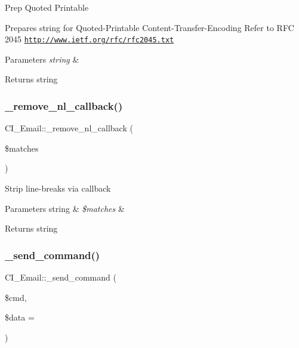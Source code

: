 Prep Quoted Printable

Prepares string for Quoted-\/\+Printable Content-\/\+Transfer-\/\+Encoding Refer to R\+FC 2045 \href{http://www.ietf.org/rfc/rfc2045.txt}{\tt http\+://www.\+ietf.\+org/rfc/rfc2045.\+txt}


\begin{DoxyParams}{Parameters}
{\em string} & \\
\hline
\end{DoxyParams}
\begin{DoxyReturn}{Returns}
string 
\end{DoxyReturn}
\mbox{\label{class_c_i___email_a110b529d3b6362464816bf08d2342f2d}} 
\subsubsection{\texorpdfstring{\+\_\+remove\+\_\+nl\+\_\+callback()}{\_remove\_nl\_callback()}}
{\footnotesize\ttfamily C\+I\+\_\+\+Email\+::\+\_\+remove\+\_\+nl\+\_\+callback (\begin{DoxyParamCaption}\item[{}]{\$matches }\end{DoxyParamCaption})\hspace{0.3cm}{\ttfamily [protected]}}

Strip line-\/breaks via callback


\begin{DoxyParams}[1]{Parameters}
string & {\em \$matches} & \\
\hline
\end{DoxyParams}
\begin{DoxyReturn}{Returns}
string 
\end{DoxyReturn}
\mbox{\label{class_c_i___email_a692744b5787a086f2730277a0d169b75}} 
\subsubsection{\texorpdfstring{\+\_\+send\+\_\+command()}{\_send\_command()}}
{\footnotesize\ttfamily C\+I\+\_\+\+Email\+::\+\_\+send\+\_\+command (\begin{DoxyParamCaption}\item[{}]{\$cmd,  }\item[{}]{\$data = {\ttfamily \textquotesingle{}\textquotesingle{}} }\end{DoxyParamCaption})\hspace{0.3cm}{\ttfamily [protected]}}

